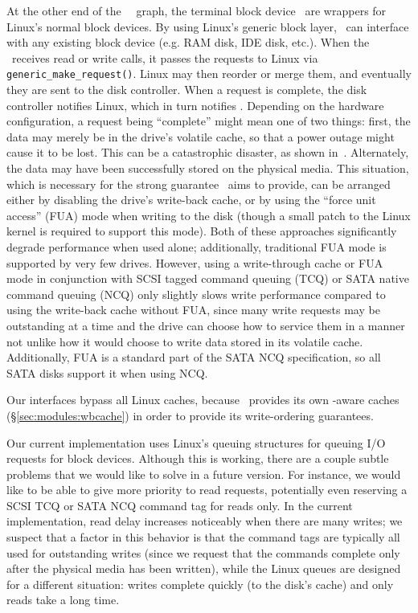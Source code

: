 At the other end of the \Kudos\ \module\ graph, the terminal block device
\modules\ are wrappers for Linux's normal block devices. By using Linux's
generic block layer, \Kudos\ can interface with any existing block device (e.g.
RAM disk, IDE disk, etc.). When the \module\ receives read or write calls, it
passes the requests to Linux via \texttt{generic\_make\_request()}. Linux may
then reorder or merge them, and eventually they are sent to the disk controller.
%
When a request is complete, the disk controller notifies Linux, which in turn
notifies \Kudos. Depending on the hardware configuration, a request being
``complete'' might mean one of two things: first, the data may merely be in the
drive's volatile cache, so that a power outage might cause it to be lost. This
can be a catastrophic disaster, as shown in~\cite{nightingale06rethink}.
Alternately, the data may have been successfully stored on the physical media.
This situation, which is necessary for the strong guarantee \Kudos\ aims to
provide, can be arranged either by disabling the drive's write-back cache, or by
using the ``force unit access'' (FUA) mode when writing to the disk (though a
small patch to the Linux kernel is required to support this mode). Both of these
approaches significantly degrade performance when used alone; additionally,
traditional FUA mode is supported by very few drives.
%
However, using a write-through cache or FUA mode in conjunction with SCSI tagged
command queuing (TCQ) or SATA native command queuing (NCQ) only slightly slows
write performance compared to using the write-back cache without FUA, since many write requests may be outstanding at
a time and the drive can choose how to service them in a manner not unlike how
it would choose to write data stored in its volatile cache. Additionally, FUA is
a standard part of the SATA NCQ specification, so all SATA
disks support it when using NCQ.

Our interfaces bypass all Linux caches, because \Kudos\ provides its own
\chdesc-aware caches (\S\ref{sec:modules:wbcache}) in order to provide its
write-ordering guarantees.

Our current implementation uses Linux's queuing structures for queuing I/O
requests for block devices. Although this is working, there are a couple subtle
problems that we would like to solve in a future version. For instance, we would
like to be able to give more priority to read requests, potentially even
reserving a SCSI TCQ or SATA NCQ command tag for reads only. In the current
implementation, read delay increases noticeably when there are many writes; we
suspect that a factor in this behavior is that the command tags are typically
all used for outstanding writes (since we request that the commands complete
only after the physical media has been written), while the Linux queues are
designed for a different situation: writes complete quickly (to the disk's
cache) and only reads take a long time.
